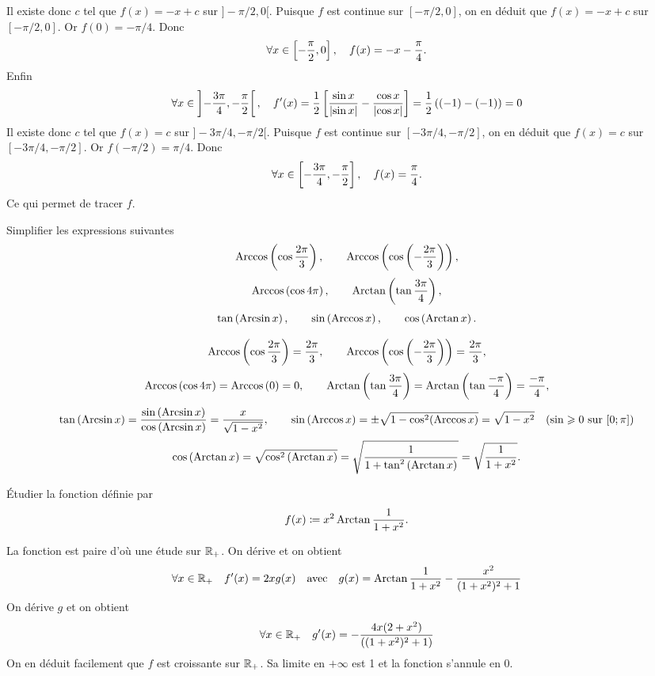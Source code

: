 \documentclass{magnolia}
\begin{document}
\begin{sol}
\begin{questions}
Il existe donc $c$ tel que $f(x)=-x+c$ sur $]-\pi/2,0[$. Puisque $f$ est continue sur $[-\pi/2,0]$, on en déduit que $f(x)=-x+c$ sur $[-\pi/2,0]$. Or $f(0)=-\pi/4$. Donc
\[\forall x\in\left[-\frac{\pi}{2},0\right],\quad f(x)=-x-\frac{\pi}{4}.\]
Enfin
\[\forall x\in\left]-\frac{3\pi}{4},-\frac{\pi}{2}\right[,\quad f'(x)=\frac{1}{2}\left[\frac{\sin x}{\left|\sin x\right|}-\frac{\cos x}{\left|\cos x\right|}\right]=\frac{1}{2}\left((-1)-(-1)\right)=0\]
Il existe donc $c$ tel que $f(x)=c$ sur $]-3\pi/4,-\pi/2[$. Puisque $f$ est continue sur $[-3\pi/4,-\pi/2]$, on en déduit que $f(x)=c$ sur $[-3\pi/4,-\pi/2]$. Or $f(-\pi/2)=\pi/4$. Donc
\[\forall x\in\left[-\frac{3\pi}{4},-\frac{\pi}{2}\right],\quad f(x)=\frac{\pi}{4}.\]
Ce qui permet de tracer $f$.
\end{questions}
\end{sol}


Simplifier les expressions suivantes
$$\operatorname{Arccos}\left(\cos\frac{2\pi}{3}\right), \qquad \operatorname{Arccos}\left(\cos\left(-\frac{2\pi}{3}\right)\right),$$
$$\operatorname{Arccos}\left(\cos 4\pi\right), \qquad \operatorname{Arctan}\left(\tan\frac{3\pi}{4}\right),$$ 
$$\tan\left(\operatorname{Arcsin} x\right), \qquad \sin\left(\operatorname{Arccos} x\right), \qquad \cos\left(\operatorname{Arctan} x\right).$$
\begin{sol}
$$\operatorname{Arccos}\left(\cos\frac{2\pi}{3}\right)=\frac{2\pi}{3}, \qquad \operatorname{Arccos}\left(\cos\left(-\frac{2\pi}{3}\right)\right)=\frac{2\pi}{3},$$
$$\operatorname{Arccos}\left(\cos 4\pi\right)=\operatorname{Arccos}\left(0\right)=0, \qquad \operatorname{Arctan}\left(\tan\frac{3\pi}{4}\right)=\operatorname{Arctan}\left(\tan\frac{-\pi}{4}\right)=\frac{-\pi}{4},$$ 
$$\tan\left(\operatorname{Arcsin} x\right)=\frac{\sin\left(\operatorname{Arcsin} x\right)}{\cos\left(\operatorname{Arcsin} x\right)}=\frac{x}{\sqrt{1-x^2}}, \qquad \sin\left(\operatorname{Arccos} x\right)=\pm \sqrt{1-\cos^2(\operatorname{Arccos} x)}=\sqrt{1-x^2} \quad (\sin \geqslant 0 \text{ sur } [0;\pi])$$
$$\cos\left(\operatorname{Arctan} x\right)=\sqrt{\cos^2\left(\operatorname{Arctan} x\right)}=\sqrt{\frac{1}{1+\tan^2\left(\operatorname{Arctan} x\right)}}=\sqrt{\frac{1}{1+x^2}}.$$
\end{sol}

Étudier la fonction définie par
$$f(x)\coloneqq x^2 \operatorname{Arctan}\frac{1}{1+x^2}.$$
\begin{sol}
La fonction est paire d'où une étude sur $\mathbb{R}_+$. On dérive et on obtient
\[\forall x\in\mathbb{R}_+ \quad f'(x)=2xg(x) \quad\text{avec}\quad g(x)=
   \operatorname{Arctan}\frac{1}{1+x^2}-\frac{x^2}{(1+x^2)^2+1}\]
On dérive $g$ et on obtient
\[\forall x\in\mathbb{R}_+ \quad g'(x)=-\frac{4x(2+x^2)}{\left((1+x^2)^2+1\right)}\]
On en déduit facilement que $f$ est croissante sur $\mathbb{R}_+$. Sa limite en $+\infty$
est 1 et la fonction s'annule en 0.
\end{sol}
\end{document}
